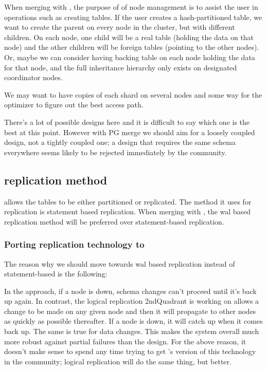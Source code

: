 	When merging with \PG, the purpose of of node management is to assist the user
	in operations such as creating tables.
	If the user creates a hash-partitioned table, we want to create the parent on
	every node in the cluster, but with different children.
	On each node, one child will be a real table (holding the data on that node)
	and the other children will be foreign tables (pointing to the other nodes).
	Or, maybe we can consider having backing table on each node holding the data
	for that node, and the full inheritance hierarchy only exists on designated
	coordinator nodes.
	
	We may want to have copies of each shard on several nodes and some way for
	the optimizer to figure out the best access path.
	
	There's a lot of possible designs here and it is difficult to say which one
	is the best at this point.
	However with PG merge we should aim for a loosely coupled design, not a tightly
	coupled one; a design that requires the same schema everywhere seems likely to be
	rejected immediately by the \PG{} community.
	


\subsection{\XC{} replication method}

	\XC{} allows the tables to be either partitioned or replicated.
	The method it uses for replication is statement based replication.
	When merging with \PG, the wal based replication method will be preferred
	over statement-based replication.



\subsubsection{Porting \XC{} replication technology to \PG}

	The reason why we should move towards wal based replication instead of statement-based
	is the following:

	In the \XC{} approach, if a node is down, schema changes can't proceed until it's
	back up again.
	In contrast, the logical replication 2ndQuadrant is working on allows a change
	to be made on any given node and then it will propagate to other nodes as quickly
	as possible thereafter.
	If a node is down, it will catch up when it comes back up.
	The same is true for data changes.
	This makes the system overall much more robust against partial failures than
	the \XC{} design.
	For the above reason, it doesn't make sense to spend any time trying to get
	\XC's version of this technology in the community;
	logical replication will do the same thing, but better. 

